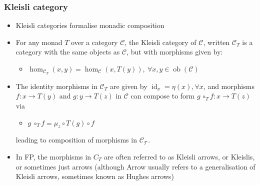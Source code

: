 \documentclass[mathserif,handout]{beamer}
\begin{document}
\begin{frame}[fragile]
  \frametitle{Kleisli category}
  \begin{itemize}
    \item Kleisli categories formalise monadic composition
  \item For any monad $T$ over a category $\mathcal{C}$, the \alert{Kleisli category} of $\mathcal{C}$, written $\mathcal{C}_T$ is a category with the same objects as $\mathcal{C}$, but with morphisms given by:
    \begin{itemize}
    \item $\operatorname{hom}_{\mathcal{C}_T}(x,y) = \operatorname{hom}_\mathcal{C}(x,T(y)),\ \forall x,y\in\operatorname{ob}(\mathcal{C})$
    \end{itemize}
  \item The identity morphisms in $\mathcal{C}_T$ are given by $\operatorname{id}_x = \eta(x), \forall x$, and morphisms $f: x\longrightarrow T(y)$ and $g: y\longrightarrow T(z)$ in $\mathcal{C}$ can compose to form $g\, \circ_T f : x\longrightarrow T(z)$ via
    \begin{itemize}
      \item $g\ \circ_T f = \mu_z \circ T(g) \circ f$
    \end{itemize}
    leading to composition of morphisms in $\mathcal{C_T}$.
    \item In FP, the morphisms in $C_T$ are often referred to as \alert{Kleisli arrows}, or \alert{Kleislis}, or sometimes just \alert{arrows} (although \alert{Arrow} usually refers to a generalisation of Kleisli arrows, sometimes known as \alert{Hughes arrows})
  \end{itemize}
\end{frame}

\end{document}
